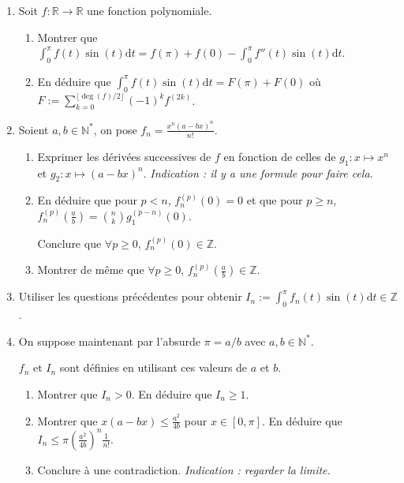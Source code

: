 \documentclass{article}
\newcommand{\di}{\mathrm{d}}
\newcommand{\mb}[1]{\mathbb{#1}}
\begin{document}
\begin{enumerate}

\item Soit $f : \mb{R} \rightarrow \mb{R}$ une fonction polynomiale.

\begin{enumerate}

\item Montrer que $\displaystyle \int_{0}^{\pi} f(t) \sin(t) \di t = f(\pi) + f(0) - \int_0^\pi f''(t) \sin(t) \di t$.

\item En déduire que $\displaystyle \int_{0}^{\pi} f(t) \sin(t) \di t = F(\pi) + F(0)$ où $\displaystyle F := \sum_{k=0}^{\lfloor \deg(f)/2 \rfloor} (-1)^k f^{(2k)}$.

\end{enumerate}


\item Soient $a,b \in \mb{N}^*$, on pose $f_n = \frac{x^n(a-bx)^n}{n!}$.

\begin{enumerate}

\item Exprimer les dérivées successives de $f$ en fonction de celles de $g_1 : x \mapsto x^n$ et $g_2 : x \mapsto (a-bx)^n$. \emph{Indication : il y a une formule pour faire cela.}

\item En déduire que pour $p <n$, $f_n^{(p)}(0) = 0$ et que pour $p \ge n$, $f_n^{(p)} (\frac{a}{b}) = \binom{n}{k} g_1^{(p-n)}(0)$.

Conclure que $\forall p \ge 0$, $f_n^{(p)}(0) \in \mb{Z}$.

\item Montrer de même que $\forall p \ge 0$, $f_n^{(p)}(\frac{a}{b}) \in \mb{Z}$.

\end{enumerate}

\item Utiliser les questions précédentes pour obtenir $\displaystyle I_n := \int_{0}^{\pi} f_n(t) \sin(t) \di t \in \mb{Z}$.

\item On suppose maintenant par l'absurde $\pi = a/b$ avec $a,b \in \mb{N}^*$.

$f_n$ et $I_n$ sont définies en utilisant ces valeurs de $a$ et $b$.


\begin{enumerate}

\item Montrer que $I_n > 0$. En déduire que $I_n \ge 1$.

\item Montrer que $x(a-bx) \le \frac{a^2}{4b}$ pour $x \in [0, \pi]$. En déduire que $I_n \le \pi (\frac{a^2}{4b})^n \frac{1}{n!}$.

\item Conclure à une contradiction. \emph{Indication : regarder la limite.}

\end{enumerate}



\end{enumerate}
\end{document}
